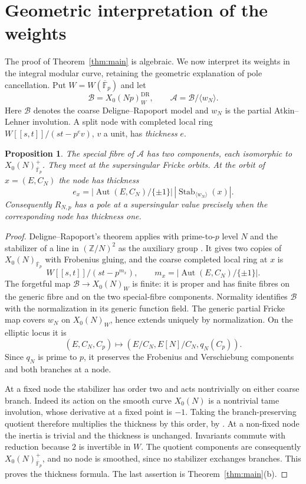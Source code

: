 \documentclass[11pt,a4paper]{article}
\numberwithin{equation}{section}
\newtheorem{proposition}[theorem]{Proposition}
\theoremstyle{definition}
\theoremstyle{remark}
\newcommand{\Fb}{\overline{\mathbb F}_p}
\newcommand{\Z}{\mathbb Z}
\newcommand{\Aut}{\operatorname{Aut}}
\newcommand{\Stab}{\operatorname{Stab}}
\begin{document}
\section{Geometric interpretation of the weights}\label{sec:geometry}
The proof of Theorem~\ref{thm:main} is algebraic. We now interpret its weights in
the integral modular curve, retaining the geometric explanation of pole cancellation.
Put $W=W(\Fb)$ and let
\[
\mathcal B=X_0(Np)^{\mathrm{DR}}_W,\qquad
\mathcal A=\mathcal B/\langle w_N\rangle.
\]
Here $\mathcal B$ denotes the coarse Deligne--Rapoport model and $w_N$ is the
partial Atkin--Lehner involution. A split node with completed local ring
$W[[s,t]]/(st-p^ev)$, $v$ a unit, has \emph{thickness} $e$.

\begin{proposition}\label{prop:geometry}
The special fibre of $\mathcal A$ has two components, each isomorphic to
$X_0(N)^+_{\Fb}$. They meet at the supersingular Fricke orbits. At the orbit of
$x=(E,C_N)$ the node has thickness
\[
e_x=|\Aut(E,C_N)/\{\pm1\}|\,
|\Stab_{\langle w_N\rangle}(x)|.
\]
Consequently $R_{N,p}$ has a pole at a supersingular value precisely when the
corresponding node has thickness one.
\end{proposition}
\begin{proof}
Deligne--Rapoport's theorem applies with prime-to-$p$ level $N$ and the stabilizer
of a line in $(\Z/N)^2$ as the auxiliary group
\citep[V, 1.14--1.20; VI, Theorem~6.9, especially (6.9.1)]{DR73}.
It gives two copies of $X_0(N)_{\Fb}$ with Frobenius gluing, and the coarse
completed local ring at $x$ is
\[
W[[s,t]]/(st-p^{m_x}),\qquad m_x=|\Aut(E,C_N)/\{\pm1\}|.
\]
The forgetful map $\mathcal B\to X_0(N)_W$ is finite: it is proper and has finite
fibres on the generic fibre and on the two special-fibre components.
Normality identifies $\mathcal B$ with the normalization in its generic function
field. The generic partial Fricke map covers $w_N$ on $X_0(N)_W$, hence extends
uniquely by normalization. On the elliptic locus it is
\[
(E,C_N,C_p)\longmapsto(E/C_N,E[N]/C_N,q_N(C_p)).
\]
Since $q_N$ is prime to $p$, it preserves the Frobenius and Verschiebung components
and both branches at a node.

At a fixed node the stabilizer has order two and acts nontrivially on either
coarse branch. Indeed its action on the smooth curve $X_0(N)$ is a nontrivial
tame involution, whose derivative at a fixed point is $-1$.
Taking the branch-preserving quotient therefore multiplies the thickness by
this order, by \citet[Proposition~10.3.48(b)--(c), pp.~526--528]{Liu02}.
At a non-fixed node the inertia is trivial and the thickness is unchanged.
Invariants commute with reduction because $2$ is invertible in $W$.
The quotient components are consequently $X_0(N)^+_{\Fb}$, and no node is
smoothed, since no stabilizer exchanges branches. This proves the thickness formula.
The last assertion is Theorem~\ref{thm:main}(b).
\end{proof}
\end{document}
